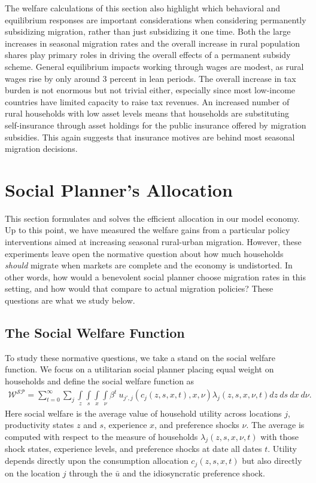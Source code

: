 \documentclass[12pt,pdftex]{article}
\begin{document}
The welfare calculations of this section also highlight which behavioral and equilibrium responses are important considerations when considering permanently subsidizing migration, rather than just subsidizing it one time. Both the large increases in seasonal migration rates and the overall increase in rural population shares play primary roles in driving the overall effects of a permanent subsidy scheme. General equilibrium impacts working through wages are modest, as rural wages rise by only around 3 percent in lean periods. The overall increase in tax burden is not enormous but not trivial either, especially since most low-income countries have limited capacity to raise tax revenues. An increased number of rural households with low asset levels means that households are substituting self-insurance through asset holdings for the public insurance offered by migration subsidies. This again suggests that insurance motives are behind most seasonal migration decisions.

\section{Social Planner's Allocation} \label{sec:planner}

This section formulates and solves the efficient allocation in our model economy. Up to this point, we have measured the welfare gains from a particular policy interventions aimed at increasing seasonal rural-urban migration. However, these experiments leave open the normative question about how much households \emph{should} migrate when markets are complete and the economy is undistorted. In other words, how would a benevolent social planner choose migration rates in this setting, and how would that compare to actual migration policies? These questions are what we study below.

\subsection{The Social Welfare Function}

To study these normative questions, we take a stand on the social welfare function. We focus on a utilitarian social planner placing equal weight on households and define the social welfare function as
\begin{align}
\mathcal{W^{SP}} = \sum_{t=0}^{\infty}\sum_{j} \int\limits_{z} \int\limits_{s} \int\limits_{x} \int\limits_{\nu} \beta^{t} \ u_{j',j}(c_{j}(z, s, x, t), x, \nu) \lambda_{j}(z, s, x, \nu, t) dz \ ds \ dx \ d\nu.
\label{eq:sp-social_welfare}
\end{align}
Here social welfare is the average value of household utility across locations $j$, productivity states $z$ and $s$, experience $x$, and preference shocks $\nu$. The average is computed with respect to the measure of households $\lambda_{j}(z, s, x, \nu, t)$ with those shock states, experience levels, and preference shocks at date all dates $t$. Utility depends directly upon the consumption allocation $c_{j}(z, s, x, t)$ but also  directly on the location $j$ through the $\bar u$ and the idiosyncratic preference shock.
\end{document}
